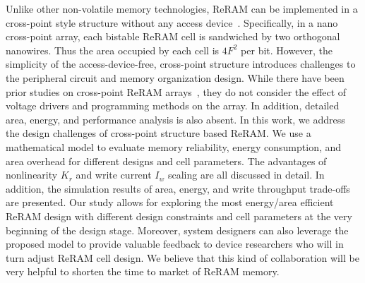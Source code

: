 Unlike other non-volatile memory technologies, ReRAM can be implemented in
a cross-point style structure without any access
device~\cite{crossbar_unity,crossbar_Panasonic}. Specifically, in a nano
cross-point array, each bistable ReRAM cell is sandwiched by two
orthogonal nanowires. Thus the area occupied by each cell is $4F^2$ per
bit. However, the simplicity of the access-device-free, cross-point
structure introduces challenges to the peripheral circuit and memory
organization design. While there have been prior studies on cross-point
ReRAM
arrays~\cite{crossbar_NANO2002_Ziegler,crossbar_NANO08_Flocke,crossbar_TED_2010,crossbar_NANO2003_Ziegler,2011_sb},
they do not consider the effect of voltage drivers and programming methods
on the array. In addition, detailed area, energy, and performance analysis
is also absent. In this work, we address the design challenges of
cross-point structure based ReRAM. We use a mathematical model to evaluate
memory reliability, energy consumption, and area overhead for different
designs and cell parameters. The advantages of nonlinearity $K_r$ and
write current $I_w$ scaling are all discussed in detail. In addition, the
simulation results of area, energy, and write throughput trade-offs are
presented. Our study allows for exploring the most energy/area efficient
ReRAM design with different design constraints and cell parameters at the
very beginning of the design stage. Moreover, system designers can also
leverage the proposed model to provide valuable feedback to device
researchers who will in turn adjust ReRAM cell design. We believe that
this kind of collaboration will be very helpful to shorten the time to
market of ReRAM memory.

